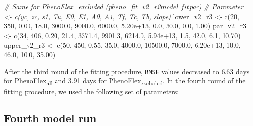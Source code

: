 \documentclass[
]{article}
\newenvironment{Shaded}{\begin{snugshade}}{\end{snugshade}}
\newcommand{\CommentTok}[1]{\textcolor[rgb]{0.56,0.35,0.01}{\textit{#1}}}
\newcommand{\DecValTok}[1]{\textcolor[rgb]{0.00,0.00,0.81}{#1}}
\newcommand{\FloatTok}[1]{\textcolor[rgb]{0.00,0.00,0.81}{#1}}
\newcommand{\FunctionTok}[1]{\textcolor[rgb]{0.00,0.00,0.00}{#1}}
\newcommand{\NormalTok}[1]{#1}
\newcommand{\OtherTok}[1]{\textcolor[rgb]{0.56,0.35,0.01}{#1}}
\begin{document}
\begin{Shaded}
\begin{Highlighting}[]
\CommentTok{\# Same for PhenoFlex\_excluded (pheno\_fit\_v2\_r2$model\_fit$par)}
\CommentTok{\# Parameter \textless{}{-} c(yc, zc,    s1,   Tu,     E0,      E1,     A0,       A1,   Tf,   Tc,   Tb, slope)}
\NormalTok{lower\_v2\_r3 }\OtherTok{\textless{}{-}} \FunctionTok{c}\NormalTok{(}\DecValTok{20}\NormalTok{, }\DecValTok{350}\NormalTok{, }\FloatTok{0.00}\NormalTok{, }\FloatTok{18.0}\NormalTok{, }\FloatTok{3000.0}\NormalTok{,  }\FloatTok{9000.0}\NormalTok{, }\FloatTok{6000.0}\NormalTok{, }\FloatTok{5.20e+13}\NormalTok{,  }\FloatTok{0.0}\NormalTok{, }\FloatTok{30.0}\NormalTok{,  }\FloatTok{0.0}\NormalTok{,  }\FloatTok{1.00}\NormalTok{)}
\NormalTok{par\_v2\_r3   }\OtherTok{\textless{}{-}} \FunctionTok{c}\NormalTok{(}\DecValTok{34}\NormalTok{, }\DecValTok{406}\NormalTok{, }\FloatTok{0.20}\NormalTok{, }\FloatTok{21.4}\NormalTok{, }\FloatTok{3371.4}\NormalTok{,  }\FloatTok{9901.3}\NormalTok{, }\FloatTok{6214.0}\NormalTok{, }\FloatTok{5.94e+13}\NormalTok{,  }\FloatTok{1.5}\NormalTok{, }\FloatTok{42.0}\NormalTok{,  }\FloatTok{6.1}\NormalTok{, }\FloatTok{10.70}\NormalTok{)}
\NormalTok{upper\_v2\_r3 }\OtherTok{\textless{}{-}} \FunctionTok{c}\NormalTok{(}\DecValTok{50}\NormalTok{, }\DecValTok{450}\NormalTok{, }\FloatTok{0.55}\NormalTok{, }\FloatTok{35.0}\NormalTok{, }\FloatTok{4000.0}\NormalTok{, }\FloatTok{10500.0}\NormalTok{, }\FloatTok{7000.0}\NormalTok{, }\FloatTok{6.20e+13}\NormalTok{, }\FloatTok{10.0}\NormalTok{, }\FloatTok{46.0}\NormalTok{, }\FloatTok{10.0}\NormalTok{, }\FloatTok{35.00}\NormalTok{)}
\end{Highlighting}
\end{Shaded}

After the third round of the fitting procedure, \texttt{RMSE} values
decreased to 6.63 days for PhenoFlex\textsubscript{all} and 3.91 days
for PhenoFlex\textsubscript{excluded}. In the fourth round of the
fitting procedure, we used the following set of parameters:

\hypertarget{fourth-model-run}{%
\subsection{Fourth model run}\label{fourth-model-run}}
\end{document}
